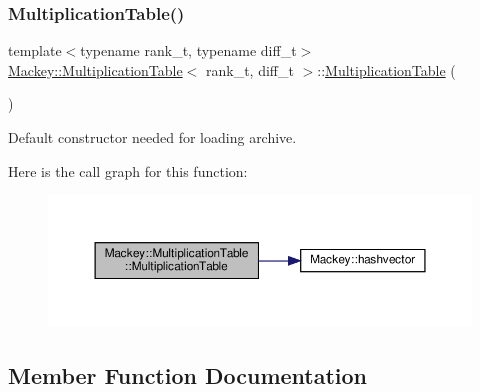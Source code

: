 \mbox{\label{classMackey_1_1MultiplicationTable_ac3bc2d09599a994b2b159def52484bae}} 
\subsubsection{\texorpdfstring{Multiplication\+Table()}{MultiplicationTable()}\hspace{0.1cm}{\footnotesize\ttfamily [2/2]}}
{\footnotesize\ttfamily template$<$typename rank\+\_\+t, typename diff\+\_\+t$>$ \\
\hyperlink{classMackey_1_1MultiplicationTable}{Mackey\+::\+Multiplication\+Table}$<$ rank\+\_\+t, diff\+\_\+t $>$\+::\hyperlink{classMackey_1_1MultiplicationTable}{Multiplication\+Table} (\begin{DoxyParamCaption}{ }\end{DoxyParamCaption})\hspace{0.3cm}{\ttfamily [inline]}}



Default constructor needed for loading archive. 

Here is the call graph for this function\+:\nopagebreak
\begin{figure}[H]
\begin{center}
\leavevmode
\includegraphics[width=350pt]{classMackey_1_1MultiplicationTable_ac3bc2d09599a994b2b159def52484bae_cgraph}
\end{center}
\end{figure}


\subsection{Member Function Documentation}
\mbox{\label{classMackey_1_1MultiplicationTable_a4371e6ba8a058073c005e636979b7230}} 
